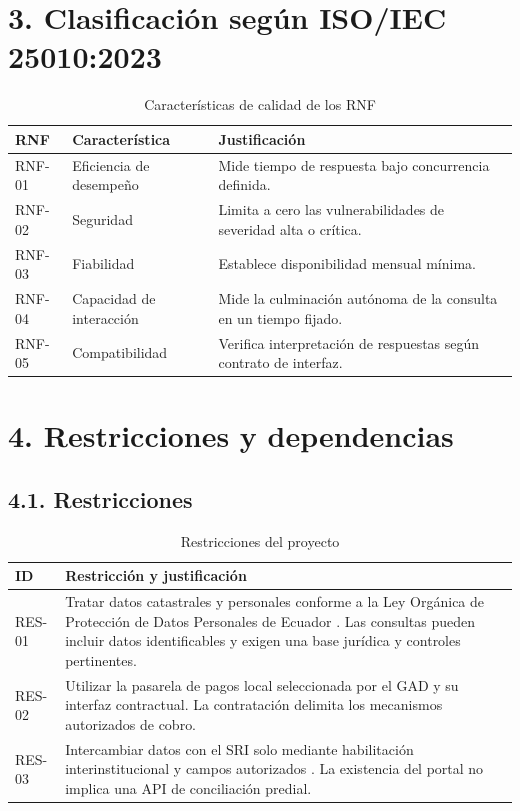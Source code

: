 \documentclass[conference,onecolumn]{IEEEtran}
\begin{document}
\section*{3. Clasificación según ISO/IEC 25010:2023}
\begin{table}[H]
\centering
\caption{Características de calidad de los RNF \cite{iso25010}}
\label{tab:clasificacion}
\scriptsize
\setlength{\tabcolsep}{3pt}
\begin{tabularx}{\columnwidth}{@{}L{0.13\columnwidth}L{0.34\columnwidth}Y@{}}
\toprule
\textbf{RNF} & \textbf{Característica} & \textbf{Justificación}\\
\midrule
RNF-01 & Eficiencia de desempeño & Mide tiempo de respuesta bajo concurrencia definida.\\
RNF-02 & Seguridad & Limita a cero las vulnerabilidades de severidad alta o crítica.\\
RNF-03 & Fiabilidad & Establece disponibilidad mensual mínima.\\
RNF-04 & Capacidad de interacción & Mide la culminación autónoma de la consulta en un tiempo fijado.\\
RNF-05 & Compatibilidad & Verifica interpretación de respuestas según contrato de interfaz.\\
\bottomrule
\end{tabularx}
\end{table}


\section*{4. Restricciones y dependencias}
\subsection*{4.1. Restricciones}
\begin{table}[H]
\centering
\caption{Restricciones del proyecto}
\label{tab:restricciones}
\scriptsize
\setlength{\tabcolsep}{3pt}
\begin{tabularx}{\columnwidth}{@{}L{0.15\columnwidth}Y@{}}
\toprule
\textbf{ID} & \textbf{Restricción y justificación}\\
\midrule
RES-01 & Tratar datos catastrales y personales conforme a la Ley Orgánica de Protección de Datos Personales de Ecuador \cite{ley_proteccion_datos_ec}. Las consultas pueden incluir datos identificables y exigen una base jurídica y controles pertinentes.\\
RES-02 & Utilizar la pasarela de pagos local seleccionada por el GAD y su interfaz contractual. La contratación delimita los mecanismos autorizados de cobro.\\
RES-03 & Intercambiar datos con el SRI solo mediante habilitación interinstitucional y campos autorizados \cite{sri_interoperabilidad}. La existencia del portal no implica una API de conciliación predial.\\
\bottomrule
\end{tabularx}
\end{table}
\end{document}
